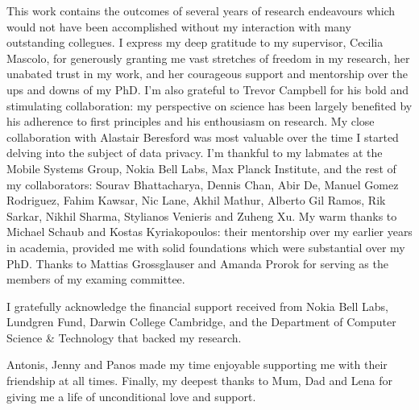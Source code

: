 
\begin{acknowledgements}
This work contains the outcomes of several years of research endeavours which would not have been accomplished without my interaction with many outstanding collegues. I express my deep gratitude to my supervisor, Cecilia Mascolo, for generously granting me vast stretches of freedom in my research, her unabated trust in my work, and her courageous support and mentorship over the ups and downs of my PhD. I'm also grateful to Trevor Campbell for his bold and stimulating collaboration: my perspective on science has been largely benefited by his adherence to first principles and his enthousiasm on research. My close collaboration with Alastair Beresford was most valuable over the time I started delving into the subject of data privacy. I'm thankful to my labmates at the Mobile Systems Group, Nokia Bell Labs, Max Planck Institute, and the rest of my collaborators:
Sourav Bhattacharya, Dennis Chan, Abir De, Manuel Gomez Rodriguez, Fahim Kawsar, Nic Lane,  Akhil Mathur, Alberto Gil Ramos, Rik Sarkar, Nikhil Sharma, Stylianos Venieris and Zuheng Xu. My warm thanks to Michael Schaub and Kostas Kyriakopoulos: their mentorship over my earlier years in academia, provided me with solid foundations which were substantial over my PhD. Thanks to
Mattias Grossglauser and Amanda Prorok for serving as the members of my examing committee.

I gratefully acknowledge the financial support received from Nokia Bell Labs, Lundgren Fund, Darwin College Cambridge, and the Department of Computer Science \& Technology that backed my research. 

Antonis, Jenny and Panos made my time enjoyable supporting me with their friendship at all times. Finally, my deepest thanks to Mum, Dad and Lena for giving me a life of unconditional love and support.
\end{acknowledgements}

